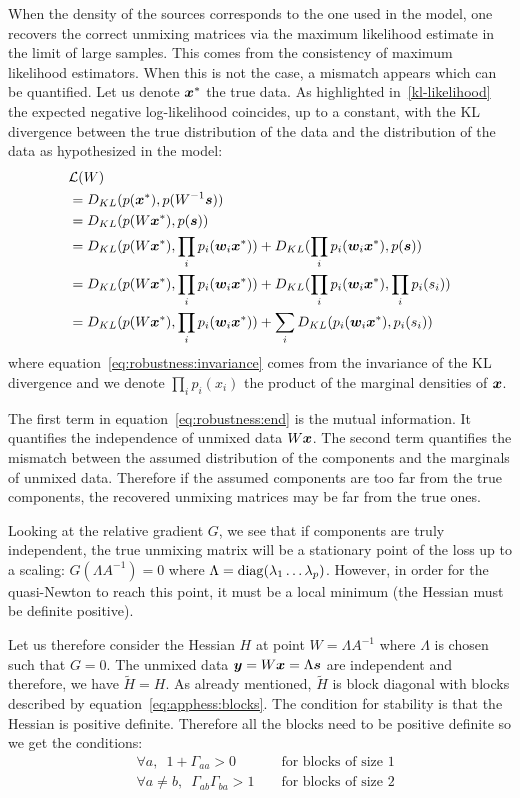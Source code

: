 When the density of the sources corresponds to the one used in the model, one
recovers the correct unmixing matrices via the maximum likelihood estimate in the
limit of large samples. This comes from the consistency of maximum likelihood
estimators.
When this is not the case, a mismatch appears which can be quantified. Let us
denote $\boldsymbol{x}^*$ the true data. As highlighted in~\eqref{kl-likelihood} the expected
negative log-likelihood coincides, up to a constant, with the KL divergence between the true
distribution of the data and the distribution of the data as hypothesized in the
model:
\begin{align}
  &\mathcal{L}(W) \\
  &=  D_{KL}(p(\boldsymbol{x}^*), p(W^{-1} \boldsymbol{s})) \\
             &=  D_{KL}(p(W\boldsymbol{x}^*), p(\boldsymbol{s})) \label{eq:robustness:invariance}\\
             &=  D_{KL}(p(W \boldsymbol{x}^*), \prod_i p_i(\boldsymbol{w}_i\boldsymbol{x}^*)) + D_{KL}(\prod_i p_i(\boldsymbol{w}_i\boldsymbol{x}^*), p(\boldsymbol{s})) \\
             &=  D_{KL}(p(W \boldsymbol{x}^*), \prod_i p_i(\boldsymbol{w}_i\boldsymbol{x}^*)) + D_{KL}(\prod_i p_i(\boldsymbol{w}_i\boldsymbol{x}^*), \prod_i p_i(s_i)) \\
  &=  D_{KL}(p(W \boldsymbol{x}^*), \prod_i p_i(\boldsymbol{w}_i\boldsymbol{x}^*)) + \sum_i D_{KL}(p_i(\boldsymbol{w}_i\boldsymbol{x}^*), p_i(s_i)) \label{eq:robustness:end}
\end{align}
where equation~\eqref{eq:robustness:invariance} comes from the invariance of the KL divergence and we
denote $\prod_i p_i(x_i)$ the product of the marginal densities of $\boldsymbol{x}$.

The first term in equation~\eqref{eq:robustness:end} is the mutual information. It quantifies the
independence of unmixed data $W \boldsymbol{x}$. The second term quantifies the mismatch
between the assumed distribution of the components and the marginals of unmixed data.
Therefore if the assumed components are too far from the true components, the
recovered unmixing matrices may be far from the true ones.


Looking at the relative gradient $G$, we see that if components are truly
independent, the true unmixing matrix will be a stationary point of the loss up
to a scaling: $G(\Lambda A^{-1})=0$ where $\Lambda=\operatorname*{diag}(\lambda_1 \dots \lambda_p)$.
However, in order for the quasi-Newton to reach this point, it must be a local
minimum (the Hessian must be definite positive). 

Let us therefore consider the Hessian $H$ at point $W = \Lambda A^{-1}$ where
$\Lambda$ is chosen such that $G = 0$. The unmixed data $\boldsymbol{y} = W \boldsymbol{x} = \Lambda \boldsymbol{s}$ are independent and
therefore, we have $\tilde{H} = H$.
As already mentioned, $\tilde{H}$ is block diagonal with blocks described by equation~\eqref{eq:apphess:blocks}.
The condition for stability is that the Hessian is positive definite. Therefore
all the blocks need to be positive definite so we get the conditions:
\begin{align}
  \label{eq:stabilitycriterion}
  & \forall a, \enspace 1 + \Gamma_{aa} > 0 && \text{ for blocks of size } 1 \\
  & \forall a \neq b, \enspace \Gamma_{ab}\Gamma_{ba} > 1 && \text{ for blocks of size } 2
\end{align}

